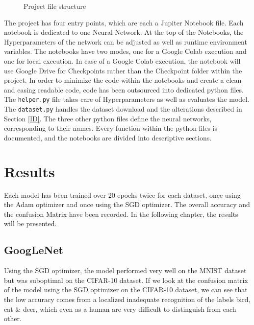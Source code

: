 \documentclass[conference]{IEEEtran}
\begin{document}
\begin{figure}[!htbp]
\caption{Project file structure}
\label{dir: file strucutre}
\end{figure}

The project has four entry points, which are each a Jupiter Notebook file. Each notebook is dedicated to one Neural Network.
At the top of the Notebooks, the Hyperparameters of the network can be adjusted as well as runtime environment variables.
The notebooks have two modes, one for a Google Colab execution and one for local execution.
In case of a Google Colab execution, the notebook will use Google Drive for Checkpoints rather than the Checkpoint folder within the project.
In order to minimize the code within the notebooks and create a clean and easing readable code, code has been outsourced into dedicated python files.
The \verb|helper.py| file takes care of Hyperparameters as well as evaluates the model. The \verb|dataset.py| handles the dataset download and the alterations described in Section \ref{ID}.
The three other python files define the neural networks, corresponding to their names. Every function within the python files is documented, and the notebooks are divided into descriptive sections.


\section{Results}\label{C4}
Each model has been trained over 20 epochs twice for each dataset, once using the Adam optimizer and once using the SGD optimizer. 
The overall accuracy and the confusion Matrix have been recorded. In the following chapter, the results will be presented.

\subsection{GoogLeNet}

Using the SGD optimizer, the model performed very well on the MNIST dataset but was suboptimal on the CIFAR-10 dataset. 
If we look at the confusion matrix of the model using the SGD optimizer on the CIFAR-10 dataset, we can see that the low accuracy comes from a localized inadequate recognition of the labels bird, cat \& deer, which even as a human are very difficult to distinguish from each other.
\end{document}
